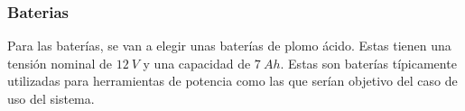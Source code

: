\subsubsection{Baterias}

Para las baterías, se van a elegir unas baterías de plomo ácido. Estas tienen una tensión nominal de $12\ V$ y una capacidad de $7\ Ah$. Estas son baterías típicamente utilizadas para herramientas de potencia como las que serían objetivo del caso de uso del sistema.